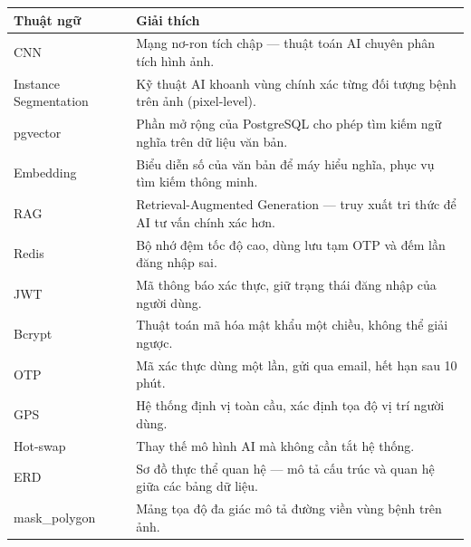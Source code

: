 ﻿\documentclass[12pt,a4paper]{article}
\begin{document}
\begin{longtable}{|p{3.5cm}|p{10.5cm}|}
\hline
\rowcolor{headerblue}
\textbf{Thuật ngữ} & \textbf{Giải thích} \\
\hline
CNN & Mạng nơ-ron tích chập --- thuật toán AI chuyên phân tích hình ảnh. \\
\hline
Instance Segmentation & Kỹ thuật AI khoanh vùng chính xác từng đối tượng bệnh trên ảnh (pixel-level). \\
\hline
pgvector & Phần mở rộng của PostgreSQL cho phép tìm kiếm ngữ nghĩa trên dữ liệu văn bản. \\
\hline
Embedding & Biểu diễn số của văn bản để máy hiểu nghĩa, phục vụ tìm kiếm thông minh. \\
\hline
RAG & Retrieval-Augmented Generation --- truy xuất tri thức để AI tư vấn chính xác hơn. \\
\hline
Redis & Bộ nhớ đệm tốc độ cao, dùng lưu tạm OTP và đếm lần đăng nhập sai. \\
\hline
JWT & Mã thông báo xác thực, giữ trạng thái đăng nhập của người dùng. \\
\hline
Bcrypt & Thuật toán mã hóa mật khẩu một chiều, không thể giải ngược. \\
\hline
OTP & Mã xác thực dùng một lần, gửi qua email, hết hạn sau 10 phút. \\
\hline
GPS & Hệ thống định vị toàn cầu, xác định tọa độ vị trí người dùng. \\
\hline
Hot-swap & Thay thế mô hình AI mà không cần tắt hệ thống. \\
\hline
ERD & Sơ đồ thực thể quan hệ --- mô tả cấu trúc và quan hệ giữa các bảng dữ liệu. \\
\hline
mask\_polygon & Mảng tọa độ đa giác mô tả đường viền vùng bệnh trên ảnh. \\
\hline
\end{longtable}
\end{document}
